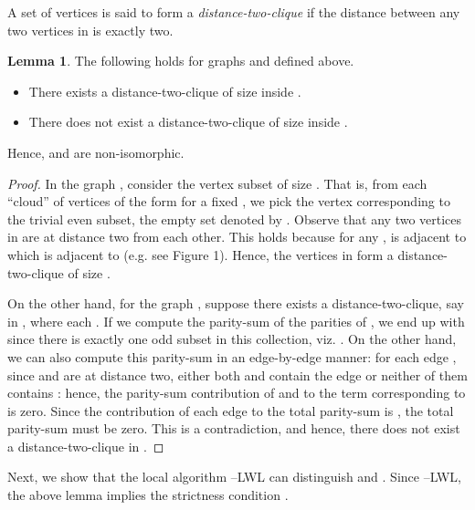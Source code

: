\documentclass{article}
\theoremstyle{definition}
\newtheorem{lemma}[theorem]{Lemma}
\newcommand{\localkwl}{--\textsf{LWL}\xspace}
\begin{document}
A set  of vertices is said to form a \emph{distance-two-clique} if the distance between any two vertices in  is exactly two. 
\begin{lemma}
	The following holds for graphs  and  defined above. 
	\begin{itemize}
		\item There exists a distance-two-clique of size  inside .
		\item There does not exist a distance-two-clique of size  inside .
	\end{itemize}
	Hence,  and  are non-isomorphic. 
\end{lemma}
\begin{proof}
	In the graph , consider the vertex subset  of size . That is, from each ``cloud'' of vertices of the form  for a fixed , we pick the vertex corresponding to the trivial even subset, the empty set denoted by . Observe that any two vertices in  are at distance two from each other. This holds because for any ,
	 is adjacent to  which is adjacent to  (e.g. see Figure 1). Hence, the vertices in  form a distance-two-clique of size . 
	
	On the other hand, for the graph , suppose there exists a distance-two-clique, say  in ,
	where each . If we compute the parity-sum of the parities of , we end up with  since there is exactly one odd subset in this collection, viz. . On the other hand, we can also compute this parity-sum in an edge-by-edge manner: for each edge , since  and  are at distance two, either both  and  contain the edge  or neither of them contains : hence, the parity-sum contribution of  and  to the term corresponding to  is zero. Since the contribution of each edge to the total parity-sum is , the total parity-sum must be zero. This is a contradiction, and hence, there does not exist a distance-two-clique in . 
\end{proof}  

Next, we show that the local algorithm \localkwl can distinguish  and . Since  \localkwl, the above lemma implies the strictness condition . 
\end{document}
